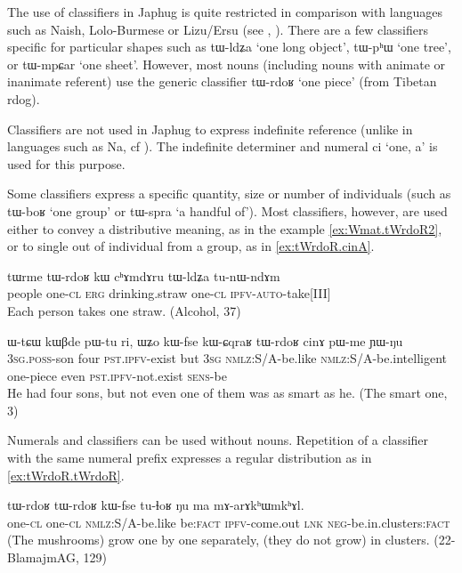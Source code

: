 \documentclass[oldfontcommands,oneside,a4paper,12pt]{article}
\newcommand{\ipa}[1]{{\phon#1}}
\begin{document}
The use of classifiers in Japhug is quite restricted in comparison with languages such as Naish, Lolo-Burmese or Lizu/Ersu (see \citealt[216-224]{lidz10na}, \citealt{zhang14classifiers}). There are a few classifiers specific for particular shapes such as \ipa{tɯ-ldʑa} `one long object', \ipa{tɯ-pʰɯ} `one tree', or \ipa{tɯ-mpɕar} `one sheet'. However, most nouns (including nouns with animate or inanimate referent) use the generic classifier \ipa{tɯ-rdoʁ} `one piece' (from Tibetan \ipa{rdog}).  

Classifiers are not used in Japhug to express indefinite reference (unlike in languages such as Na, cf \citealt[206]{lidz10na}). The indefinite determiner and numeral \ipa{ci} `one, a' is used for this purpose.

Some classifiers express a specific quantity,  size or number of individuals (such as \ipa{tɯ-boʁ} `one group' or \ipa{tɯ-spra} `a handful of'). Most classifiers, however, are used either to convey a distributive meaning, as in the example \ref{ex:Wmat.tWrdoR2}, or to single out of individual from a group, as in \ref{ex:tWrdoR.cinA}.
 
\begin{exe}
\ex \label{ex:Wmat.tWrdoR2}
\gll 
\ipa{tɯrme} 	\ipa{tɯ-rdoʁ} 	\ipa{kɯ} 	\ipa{cʰɤmdɤru} 	\ipa{tɯ-ldʑa} 	\ipa{tu-nɯ-ndɤm} \\
people one-\textsc{cl} \textsc{erg} drinking.straw one-\textsc{cl} \textsc{ipfv-auto}-take[III] \\
\glt Each person takes one straw. (Alcohol, 37)
\end{exe}
 
\begin{exe}
\ex \label{ex:tWrdoR.cinA}
\gll 
\ipa{ɯ-tɕɯ} 	\ipa{kɯβde} 	\ipa{pɯ-tu} 	\ipa{ri,} 	\ipa{ɯʑo} 	\ipa{kɯ-fse} 	\ipa{kɯ-ɕqraʁ} 	\ipa{tɯ-rdoʁ} 	\ipa{cinɤ} 	\ipa{pɯ-me} 	\ipa{ɲɯ-ŋu} 	\\
\textsc{3sg.poss}-son four \textsc{pst.ipfv}-exist but \textsc{3sg} \textsc{nmlz}:S/A-be.like \textsc{nmlz}:S/A-be.intelligent one-piece even \textsc{pst.ipfv}-not.exist \textsc{sens}-be \\
\glt He had four sons, but not even one of them was as smart as he. (The smart one, 3)
\end{exe} 
 
 Numerals and classifiers can be used without nouns. Repetition of a classifier with the same numeral prefix  expresses a regular distribution as in \ref{ex:tWrdoR.tWrdoR}.
 
 \begin{exe}
\ex \label{ex:tWrdoR.tWrdoR}
\gll 
 \ipa{tɯ-rdoʁ} 	\ipa{tɯ-rdoʁ} 	\ipa{kɯ-fse} 	\ipa{tu-ɬoʁ} 	\ipa{ŋu} 	\ipa{ma} 	\ipa{mɤ-arɤkʰɯmkʰɤl.}  \\
  one-\textsc{cl}  one-\textsc{cl} \textsc{nmlz}:S/A-be.like  be:\textsc{fact} \textsc{ipfv}-come.out \textsc{lnk} \textsc{neg}-be.in.clusters:\textsc{fact} \\
 \glt (The mushrooms) grow one by one separately, (they do not grow) in clusters. (22-BlamajmAG, 129)
\end{exe}
 
\end{document}
